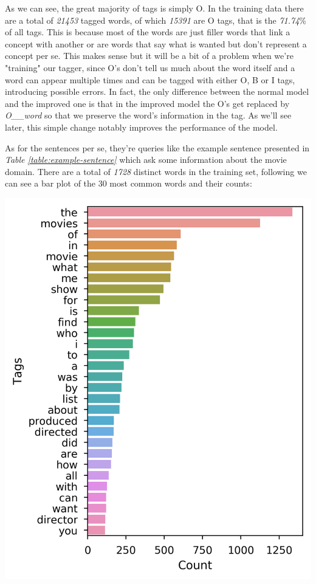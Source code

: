\documentclass[11pt,a4paper]{article}
\begin{document}
	As we can see, the great majority of tags is simply O. In the training data there are a total of \textit{21453} tagged words, of which \textit{15391} are O tags, that is the \textit{71.74}\% of all tags. This is because most of the words are just filler words that link a concept with another or are words that say what is wanted but don't represent a concept per se. This makes sense but it will be a bit of a problem when we're "training" our tagger, since O's don't tell us much about the word itself and a word can appear multiple times and can be tagged with either O, B or I tags, introducing possible errors. In fact, the only difference between the normal model and the improved one is that in the improved model the O's get replaced by \textit{O\_\_word} so that we preserve the word's information in the tag. As we'll see later, this simple change notably improves the performance of the model. 
	
	As for the sentences per se, they're queries like the example sentence presented in \textit{Table \ref{table:example-sentence}} which ask some information about the movie domain. There are a total of \textit{1728} distinct words in the training set, following we can see a bar plot of the 30 most common words and their counts:

	\hspace*{-0.9cm}\includegraphics[scale=0.7]{barplot_iob&w_tag_counts_onlyW}
	
\end{document}
